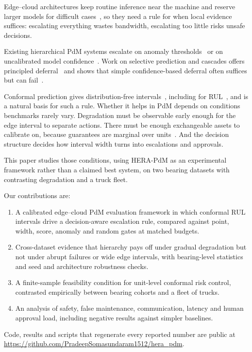 \documentclass[conference]{IEEEtran}
\begin{document}
Edge--cloud architectures keep routine inference near the machine and reserve larger models for difficult cases~\cite{ren2021cloudedge}, so they need a rule for when local evidence suffices: escalating everything wastes bandwidth, escalating too little risks unsafe decisions.

Existing hierarchical PdM systems escalate on anomaly thresholds~\cite{saleh2026hama} or on uncalibrated model confidence~\cite{yao2026ecdistill}. Work on selective prediction and cascades offers principled deferral~\cite{geifman2017selective,huang2025cab} and shows that simple confidence-based deferral often suffices but can fail~\cite{jitkrittum2023cascade}.

Conformal prediction gives distribution-free intervals~\cite{romano2019cqr,barber2021jackknife}, including for RUL~\cite{javanmardi2023conformal,wang2026conformal}, and is a natural basis for such a rule. Whether it helps in PdM depends on conditions benchmarks rarely vary. Degradation must be observable early enough for the edge interval to separate actions. There must be enough exchangeable assets to calibrate on, because guarantees are marginal over units~\cite{foygel2021limits,dunn2023hierarchical}. And the decision structure decides how interval width turns into escalations and approvals.

This paper studies those conditions, using HERA-PdM as an experimental framework rather than a claimed best system, on two bearing datasets with contrasting degradation and a truck fleet.

Our contributions are:
\begin{enumerate}
\item A calibrated edge--cloud PdM evaluation framework in which conformal RUL intervals drive a decision-aware escalation rule, compared against point, width, score, anomaly and random gates at matched budgets.
\item Cross-dataset evidence that hierarchy pays off under gradual degradation but not under abrupt failures or wide edge intervals, with bearing-level statistics and seed and architecture robustness checks.
\item A finite-sample feasibility condition for unit-level conformal risk control, contrasted empirically between bearing cohorts and a fleet of \flN{} trucks.
\item An analysis of safety, false maintenance, communication, latency and human approval load, including negative results against simpler baselines.
\end{enumerate}
Code, results and scripts that regenerate every reported number are public at \url{https://github.com/PradeepSomasundaram1512/hera_pdm}.
\end{document}
